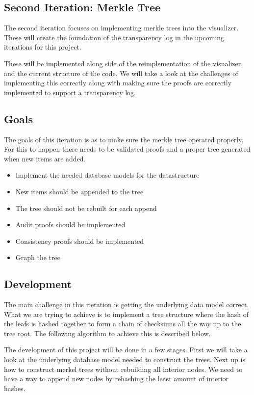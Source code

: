 \documentclass[../Main/thesis.tex]{subfiles}
\begin{document}
\subsection{Second Iteration: Merkle Tree}%
\label{sub:merkle_tree}
The second iteration focuses on implementing merkle trees into the visualizer.
These will create the foundation of the transparency log in the upcoming
iterations for this project.

These will be implemented along side of the reimplementation of the visualizer,
and the current structure of the code. We will take a look at the challenges of
implementing this correctly along with making sure the proofs are correctly
implemented to support a transparency log.

\subsection*{Goals}%
\label{sub:second_iteration_goals}
The goals of this iteration is as to make sure the merkle tree operated
properly. For this to happen there needs to be validated proofs and a proper
tree generated when new items are added.

\begin{itemize}
    \item Implement the needed database models for the datastructure
    \item New items should be appended to the tree
    \item The tree should not be rebuilt for each append
    \item Audit proofs should be implemented
    \item Consistency proofs should be implemented
    \item Graph the tree
\end{itemize}


\subsection*{Development}%
\label{sub:second_iteration_development}
The main challenge in this iteration is getting the underlying data model
correct. What we are trying to achieve is to implement a tree structure where
the hash of the leafs is hashed together to form a chain of checksums all the
way up to the tree root. The following algorithm to achieve this is described
below.

The development of this project will be done in a few stages. First we will take
a look at the underlying database model needed to construct the trees. Next up
is how to construct merkel trees without rebuilding all interior nodes. We need
to have a way to append new nodes by rehashing the least amount of interior
hashes.
\end{document}

